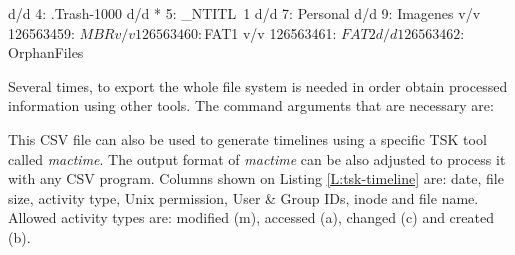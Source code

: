 \begin{terminal}[caption=TSK fls output example,label=L:fls-output-example]
%
%
d/d 4:	.Trash-1000
d/d * 5:	_NTITL~1
d/d 7:	Personal
d/d 9:	Imagenes
v/v 126563459:	$MBR
v/v 126563460:	$FAT1
v/v 126563461:	$FAT2
d/d 126563462:	$OrphanFiles
\end{terminal}

Several times, to export the whole file system is needed in order obtain
processed information using other tools. The command arguments that are
necessary are:

\begin{terminal}[caption=Export file system to CSV,label=L:fls-csv-export]
%
%

\end{terminal}

This CSV file can also be used to generate timelines using a specific TSK tool 
called \textit{mactime}. The output format of \textit{mactime} can be also
adjusted to process it with any CSV program. Columns shown on Listing
\ref{L:tsk-timeline} are: date, file size, activity type, Unix permission, User
\& Group IDs, inode and file name. Allowed activity types are: modified (m),
accessed (a), changed (c) and created (b).

